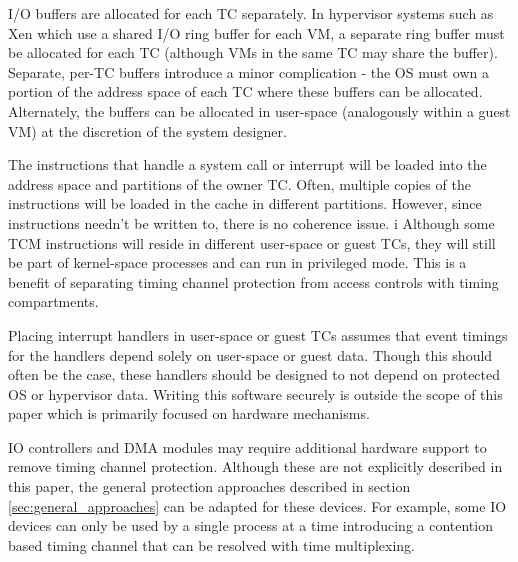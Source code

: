 I/O buffers are allocated for each TC separately. In hypervisor systems such as
Xen\cite{xen-sosp03} which use a shared I/O ring buffer for each VM, a separate
ring buffer must be allocated for each TC (although VMs in the same TC may share
the buffer). Separate, per-TC buffers introduce a minor complication - the OS
must own a portion of the address space of each TC where these buffers can be
allocated. Alternately, the buffers can be allocated in user-space (analogously
within a guest VM) at the discretion of the system designer. 

The instructions that handle a system call or interrupt will be loaded into the
address space and partitions of the owner TC. Often, multiple copies of the 
instructions will be loaded in the cache in different partitions. However, 
since instructions needn't be written to, there is no coherence issue. 
i
Although some TCM instructions will reside in different user-space or guest 
TCs, they will still be part of kernel-space processes and can run in 
privileged mode. This is a benefit of separating timing channel protection 
from access controls with timing compartments.

Placing interrupt handlers in 
user-space or guest TCs assumes that event timings for the handlers depend
solely on user-space or guest data. Though this should often be the case, these 
handlers should be designed to not depend on protected OS or hypervisor data. 
Writing this software securely is outside the scope of this paper which is 
primarily focused on hardware mechanisms.

IO controllers and DMA modules may require additional hardware support to 
remove timing channel protection. Although these are not explicitly described 
in this paper, the general protection approaches described in section
\ref{sec:general_approaches} can be adapted for these devices. For example,
some IO devices can only be used by a single process at a time introducing a
contention based timing channel that can be resolved with time multiplexing.



